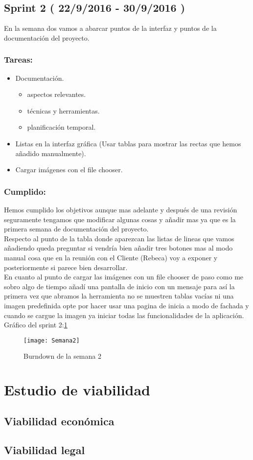 \subsection{Sprint 2 ( 22/9/2016 - 30/9/2016 )}
En la semana dos vamos a abarcar puntos de la interfaz y puntos de la documentación del proyecto.
 
\subsubsection{Tareas:}
\begin{itemize}
\item Documentación. 
\begin{itemize}
	\item aspectos relevantes. 
	\item técnicas y herramientas.
	\item planificación temporal.
	\end{itemize}
\item Listas en la interfaz gráfica (Usar tablas para mostrar las rectas que hemos añadido manualmente).
\item Cargar imágenes con el file chooser.
\end{itemize}

\subsubsection{Cumplido:}
Hemos cumplido los objetivos aunque mas adelante y después de una revisión seguramente tengamos que modificar algunas cosas y añadir mas ya que es la primera semana de documentación del proyecto.\\
Respecto al punto de la tabla donde aparezcan las listas de lineas que vamos añadiendo queda preguntar si vendría bien añadir tres botones mas al modo manual cosa que en la reunión con el Cliente (Rebeca) voy a exponer y posteriormente si parece bien desarrollar.\\
En cuanto al punto de cargar las imágenes con un file chooser de paso como me sobro algo de tiempo añadí una pantalla de inicio con un mensaje para así la primera vez que abramos la herramienta no se muestren tablas vacías ni una imagen predefinida opte por hacer usar una pagina de inicia a modo de fachada y cuando se cargue la imagen ya iniciar todas las funcionalidades de la aplicación.
Gráfico del sprint 2:\ref{fig:A.2.2}
\begin{figure}[h]
\centering
\texttt{[image: Semana2]}
\caption{Burndown de la semana 2}
\label{fig:A.2.2}
\end{figure}

\section{Estudio de viabilidad}

\subsection{Viabilidad económica}

\subsection{Viabilidad legal}


